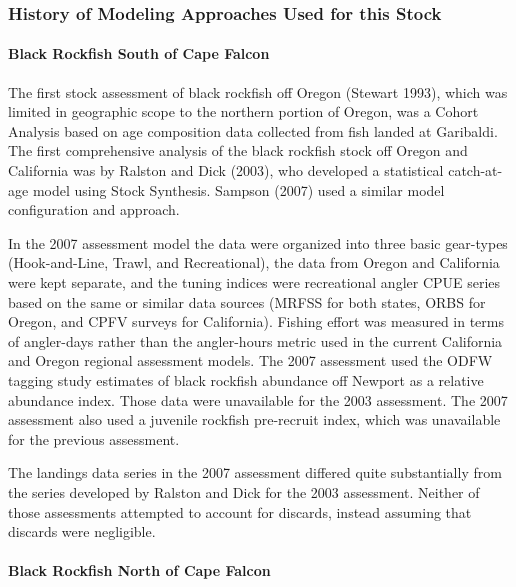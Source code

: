 \documentclass[11pt,
  english,
  letterpaper,
]{article}
\begin{document}
\hypertarget{history-of-modeling-approaches-used-for-this-stock}{%
\subsubsection{History of Modeling Approaches Used for this Stock}\label{history-of-modeling-approaches-used-for-this-stock}}

\hypertarget{black-rockfish-south-of-cape-falcon}{%
\paragraph{Black Rockfish South of Cape Falcon}\label{black-rockfish-south-of-cape-falcon}}

The first stock assessment of black rockfish off Oregon (Stewart 1993), which was limited in geographic scope to the northern portion of Oregon, was a Cohort Analysis based on age composition data collected from fish landed at Garibaldi. The first comprehensive analysis of the black rockfish stock off Oregon and California was by Ralston and Dick (2003), who developed a statistical catch-at-age model using Stock Synthesis. Sampson (2007) used a similar model configuration and approach.

In the 2007 assessment model the data were organized into three basic gear-types (Hook-and-Line, Trawl, and Recreational), the data from Oregon and California were kept separate, and the tuning indices were recreational angler CPUE series based on the same or similar data sources (MRFSS for both states, ORBS for Oregon, and CPFV surveys for California). Fishing effort was measured in terms of angler-days rather than the angler-hours metric used in the current California and Oregon regional assessment models. The 2007 assessment used the ODFW tagging study estimates of black rockfish abundance off Newport as a relative abundance index. Those data were unavailable for the 2003 assessment. The 2007 assessment also used a juvenile rockfish pre-recruit index, which was unavailable for the previous assessment.

The landings data series in the 2007 assessment differed quite substantially from the series developed by Ralston and Dick for the 2003 assessment. Neither of those assessments attempted to account for discards, instead assuming that discards were negligible.

\hypertarget{black-rockfish-north-of-cape-falcon}{%
\paragraph{Black Rockfish North of Cape Falcon}\label{black-rockfish-north-of-cape-falcon}}
\end{document}
